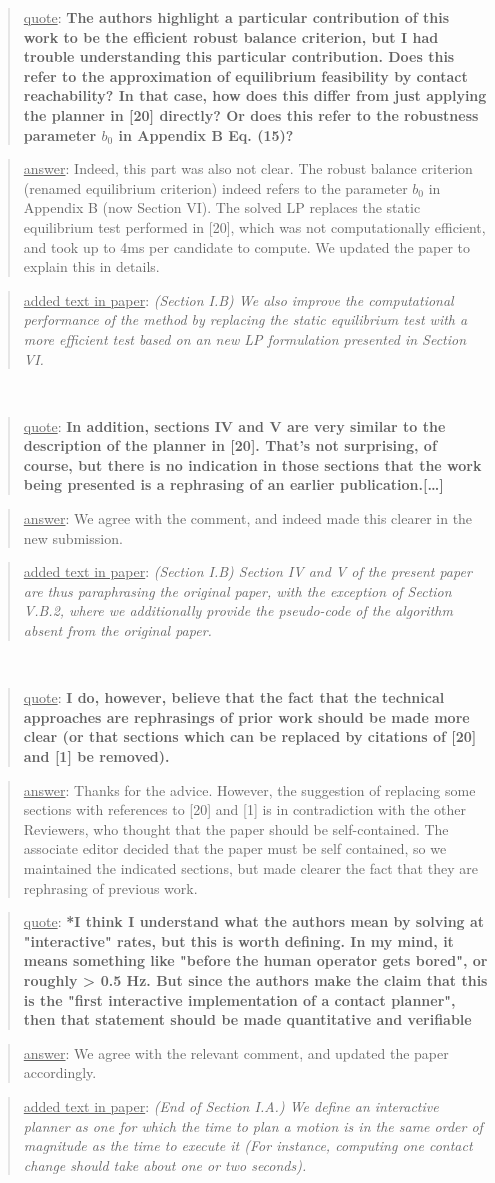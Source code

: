 \documentclass[a4paper]{article}
\newcommand{\done}[0]{}
\newcommand\quot[1]{\begin{quote} \underline{quote}: \textbf{#1}\end{quote}}
\newcommand\as[1]{\begin{quote} \underline{answer}: {#1}\end{quote} }
\newcommand\qt[1]{\begin{quote} \underline{added text in paper}: \textit{#1}\end{quote} \leavevmode \\ }
\begin{document}
\quot{The authors highlight a particular
contribution of this work to be the efficient robust balance criterion,
but I had trouble understanding this particular contribution. Does this
refer to the approximation of equilibrium feasibility by contact
reachability? In that case, how does this differ from just applying the
planner in [20] directly? Or does this refer to the robustness
parameter $b_0$ in Appendix B Eq. (15)?}
\as{Indeed, this part was also not clear. The robust balance criterion (renamed equilibrium criterion) indeed refers to the parameter $b_0$ in Appendix B (now Section VI). The solved
LP replaces the static equilibrium test performed in [20], which was not computationally efficient, and took up to 4ms per candidate to compute. We updated the paper to explain
this in details.}
\qt{(Section I.B) We also improve the computational performance
of the method by replacing the static equilibrium test with a more efficient test based on an
new LP formulation presented in Section VI.}
\done

\quot{In addition, sections IV and V are very similar to the description of
the planner in [20]. That's not surprising, of course, but there is no
indication in those sections that the work being presented is a
rephrasing of an earlier publication.[\dots] }
\as{We agree with the comment, and indeed made this clearer in the new submission.}
\qt{(Section I.B) Section IV and V of the present paper are thus paraphrasing the original paper, with the exception of Section V.B.2, where we additionally provide the pseudo-code of the algorithm absent from the original paper.}\done

\quot{I do, however,
believe that the fact that the technical approaches are rephrasings of
prior work should be made more clear (or that sections which can be
replaced by citations of [20] and [1] be removed).}
\as{Thanks for the advice. However, the suggestion of replacing some sections with references to [20] and [1] is in contradiction with the other Reviewers, who thought that the paper should be self-contained.
The associate editor decided that the paper must be self contained, so we maintained the indicated sections, but made clearer the fact that they are rephrasing of previous work. }\done

\quot{*I think I understand what the authors mean by solving at
"interactive" rates, but this is worth defining. In my mind, it means
something like "before the human operator gets bored", or roughly > 0.5
Hz. But since the authors make the claim that this is the "first
interactive implementation of a contact planner", then that statement
should be made quantitative and verifiable}
\as{We agree with the relevant comment, and updated the paper accordingly.}
\qt{(End of Section I.A.) We define an interactive planner as one for which the time to plan a motion is in the same order of magnitude as the time to execute it (For instance, computing one contact change should take about one or two seconds).}\done
\end{document}
